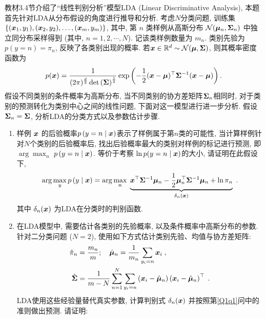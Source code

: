 \documentclass[answers]{exam}  %
\begin{document}
\begin{questions}
	教材3.4节介绍了“线性判别分析”模型LDA (Linear Discriminative Analysis), 本题首先针对LDA从分布假设的角度进行推导和分析.
	考虑$N$分类问题, 训练集 $\left\{({\boldsymbol{x}}_1,y_1),({\boldsymbol{x}}_2,y_2),\ldots,({\boldsymbol{x}}_m,y_m)\right\}$, 其中, 第 $n$ 类样例从高斯分布 $\mathcal{N}(\boldsymbol{\mu}_n,\boldsymbol{\Sigma}_n)$ 中独立同分布采样得到 (其中, $n=1,2,\cdots,N$). 记该类样例数量为 $m_n$. 类别先验为 $p\left(y=n\right)=\pi_n$, 反映了各类别出现的概率. 若${\boldsymbol{x}}\in \mathbb{R}^d \sim \mathcal{N}(\boldsymbol{\mu},\boldsymbol{\Sigma})$, 则其概率密度函数为
	\begin{align}
		p({\boldsymbol{x}})=\frac{1}{(2\pi)^{\frac{d}{2}}\det\left(\boldsymbol{\Sigma}\right)^\frac{1}{2}}\exp\left(-\frac{1}{2}({\boldsymbol{x}}-\boldsymbol{\mu})^\top\boldsymbol{\Sigma}^{-1}({\boldsymbol{x}}-\boldsymbol{\mu})\right).
	\end{align}
	假设不同类别的条件概率为高斯分布, 当不同类别的协方差矩阵$\boldsymbol{\Sigma}_n$相同时, 对于类别的预测转化为类别中心之间的线性问题, %
	下面对这一模型进行进一步分析.
	假设$\boldsymbol{\Sigma}_n = \boldsymbol{\Sigma}$, 分析LDA的分类方式以及参数估计步骤.
	\begin{enumerate}
		\item \label{Q1q1}样例 ${\boldsymbol{x}}$ 的后验概率$p\left(y=n\mid {\boldsymbol{x}}\right)$表示了样例属于第$n$类的可能性, 当计算样例针对$N$个类别的后验概率后, 找出后验概率最大的类别对样例的标记进行预测, 即 $\arg\max_n$ $p\left(y=n\mid {\boldsymbol{x}}\right)$. 等价于考察 $\ln p(y=n\mid {\boldsymbol{x}})$的大小,  请证明在此假设下,
		      \begin{equation}
			      \arg\max_y p\left(y\mid {\boldsymbol{x}}\right)=\arg\max_n\; \underbrace{{\boldsymbol{x}}^{\top} \boldsymbol{\Sigma}^{-1} \boldsymbol{\mu}_{n}-\frac{1}{2} \boldsymbol{\mu}_{n}^{\top} \boldsymbol{\Sigma}^{-1} \boldsymbol{\mu}_{n}+\ln \pi_{n}}_{\delta_n({\boldsymbol{x}})}    \;.
		      \end{equation}
		      其中 $\delta_{n}({\boldsymbol{x}})$ 为LDA在分类时的判别函数.
		\item \label{Q1q2} 在LDA模型中, 需要估计各类别的先验概率, 以及条件概率中高斯分布的参数. 针对二分类问题 ($N=2$), 使用如下方式估计类别先验、均值与协方差矩阵:
		      \begin{align}
			      \hat{\pi}_{n} & =\frac{m_n}{m}; \quad
			      \hat{\boldsymbol{\mu}}_{n}=\frac{1}{m_n}\sum_{y_{i}=n} {\boldsymbol{x}}_{i}\;,                                                                                       \\
			      \hat{\boldsymbol{\Sigma}} & =\frac{1}{m-N}\sum_{n=1}^{N} \sum_{y_{i}=n}\left({\boldsymbol{x}}_{i}-\hat{\boldsymbol{\mu}}_{n}\right)\left({\boldsymbol{x}}_{i}-\hat{\boldsymbol{\mu}}_{n}\right)^{\top}\;.
		      \end{align}
		      LDA使用这些经验量替代真实参数, 计算判别式 $\delta_n({\boldsymbol{x}})$ 并按照第\ref{Q1q1}问中的准则做出预测. 请证明:
		      \begin{equation}

\end{equation}
\end{enumerate}
\end{questions}
\end{document}
